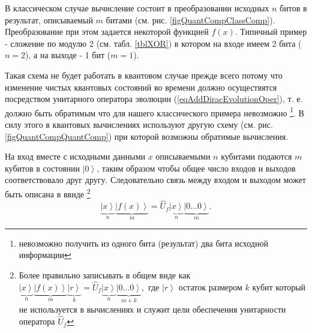 

В классическом случае вычисление состоит в преобразовании исходных $n$
битов в результат, описываемый $m$ битами
(см. рис. \ref{figQuantCompClassComp}). Преобразование при этом
задается некоторой функцией $f\left(x\right)$. Типичный пример -
сложение по модулю 2 (см. табл. \ref {tblXOR}) в котором на входе имеем 2 бита
($n = 2$), а на выходе - 1 бит ($m = 1$).



Такая схема не будет работать в квантовом случае прежде всего потому
что изменение чистых квантовых состояний во времени должно
осуществятся посредством унитарного оператора эволюции
(\ref{eqAddDiracEvolutionOper}), т. е. должно быть обратимым что для
нашего классического примера невозможно \footnote{невозможно получить
  из одного бита (результат) два бита исходной информации}. В силу
этого в квантовых вычислениях  используют другую схему
(см. рис. \ref{figQuantCompQuantComp}) при которой возможны обратимые
вычисления.  

На вход вместе с исходными данными $x$ описываемыми $n$ кубитами
подаются $m$ кубитов в состоянии $\left|0\right>$, таким
образом чтобы общее число входов и выходов соответствовало друг
другу. Следовательно связь между входом и выходом может быть описана в
ввиде
\footnote{Более правильно записывать в общем виде как 
$
\underbrace{\left|x\right>}_n
\underbrace{\left|f\left(x\right)\right>}_m
\underbrace{\left|r\right>}_k = 
\hat{U}_f \underbrace{\left|x\right>}_n
\underbrace{\left|0 \dots 0\right>}_{m+k},
$
где $\left|r\right>$ остаток размером $k$ кубит который не
используется в вычислениях и служит цели обеспечения унитарности
оператора $\hat{U}_f$
}
\begin{equation}
\underbrace{\left|x\right>}_n
\underbrace{\left|f\left(x\right)\right>}_m = 
\hat{U}_f \underbrace{\left|x\right>}_n\underbrace{\left|0 \dots
  0\right>}_m.
\label{eqQuantCompQuantComp}
\end{equation}


